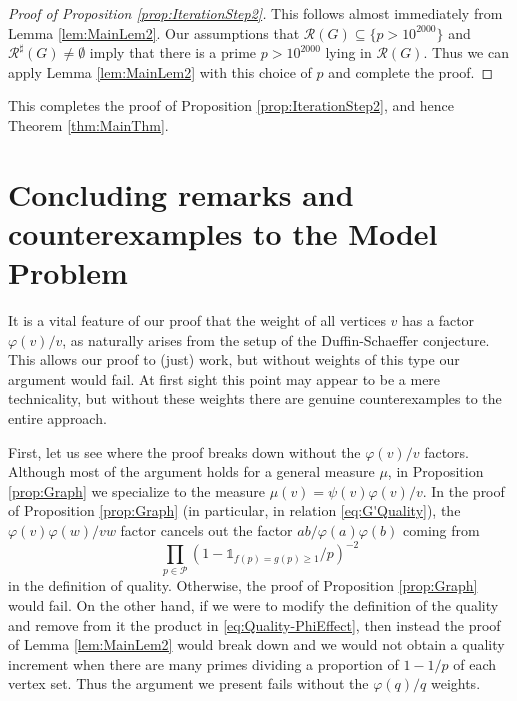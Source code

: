 \documentclass[12pt]{amsart}
\numberwithin{equation}{section}
\theoremstyle{definition}
\theoremstyle{remark}
\newcommand{\CP}{\mathcal{P}}
\newcommand{\CR}{\mathcal{R}}
\newcommand{\un}{\mathds{1}}
\renewcommand{\phi}{\varphi}
\renewcommand{\ge}{\geqslant}
\begin{document}
\begin{proof}[Proof of Proposition \ref{prop:IterationStep2}]
This follows almost immediately from Lemma \ref{lem:MainLem2}. Our assumptions that $\CR(G)\subseteq\{p>10^{2000}\}$ and $\CR^\sharp(G)\neq\emptyset$ imply that there is a prime $p>10^{2000}$ lying in $\CR(G)$. 
Thus we can apply Lemma \ref{lem:MainLem2} with this choice of $p$ and complete the proof.
\end{proof}



This completes the proof of Proposition \ref{prop:IterationStep2}, and hence Theorem \ref{thm:MainThm}.



\section{Concluding remarks and counterexamples to the Model Problem}\label{sec:Concluding}

It is a vital feature of our proof that the weight of all vertices $v$ has a factor $\phi(v)/v$, as naturally arises from the setup of the Duffin-Schaeffer conjecture. This allows our proof to (just) work, but without weights of this type our argument would fail. At first sight this point may appear to be a mere technicality, but without these weights there are genuine counterexamples to the entire approach.

\medskip

First, let us see where the proof breaks down without the $\phi(v)/v$ factors. Although most of the argument holds for a general measure $\mu$, in Proposition \ref{prop:Graph} we specialize to the measure $\mu(v)=\psi(v)\phi(v)/v$. In the proof of Proposition \ref{prop:Graph} (in particular, in relation \eqref{eq:G'Quality}), the $\phi(v)\phi(w)/v w$ factor cancels out the factor $a b /\phi(a)\phi(b)$ coming from
\begin{equation}\label{eq:Quality-PhiEffect}
\prod_{p\in\CP}(1-\un_{f(p)=g(p)\ge 1}/p)^{-2}
\end{equation}
in the definition of quality. Otherwise, the proof of Proposition \ref{prop:Graph} would fail. On the other hand, if we were to modify the definition of the quality and remove from it the product in \eqref{eq:Quality-PhiEffect}, then instead the proof of Lemma \ref{lem:MainLem2} would break down and we would not obtain a quality increment when there are many primes dividing a proportion of $1-1/p$ of each vertex set. Thus the argument we present fails without the $\phi(q)/q$ weights.
\end{document}

